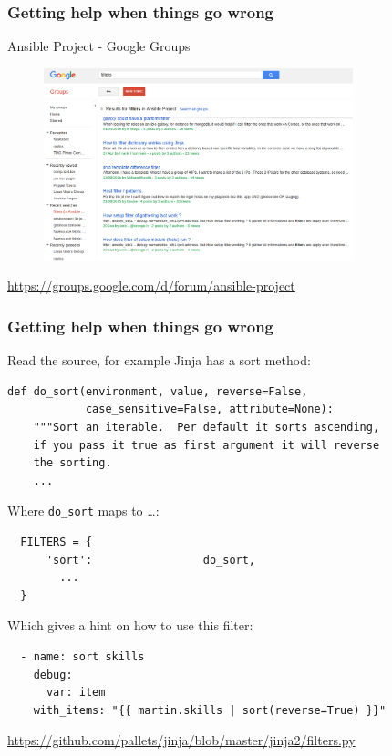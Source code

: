 \documentclass[pdf]{beamer}
\begin{document}

\begin{frame}[fragile]
  \frametitle{Getting help when things go wrong}
  Ansible Project - Google Groups
  \begin{center}
    \begin{figure}
      \includegraphics[width=0.8\textwidth]{ansible-google-group.png}
    \end{figure}
  \end{center}
  \tiny \url{https://groups.google.com/d/forum/ansible-project}
\end{frame}

\begin{frame}[t,fragile]
  \frametitle{Getting help when things go wrong}
  Read the source, for example Jinja has a sort method:
  \begin{verbatim}
def do_sort(environment, value, reverse=False,
            case_sensitive=False, attribute=None):
    """Sort an iterable.  Per default it sorts ascending,
    if you pass it true as first argument it will reverse
    the sorting.
    ...
  \end{verbatim}
  \pause{}
  Where {\color{blue}\texttt{do\_sort}} maps to \ldots {}:
  \begin{verbatim}
  FILTERS = {
      'sort':                 do_sort,
        ...
  }
  \end{verbatim}
  \pause{}
  Which gives a hint on how to use this filter:
  \begin{verbatim}
  - name: sort skills
    debug:
      var: item
    with_items: "{{ martin.skills | sort(reverse=True) }}"
  \end{verbatim}
  \tiny \url{https://github.com/pallets/jinja/blob/master/jinja2/filters.py}
\end{frame}
\end{document}
